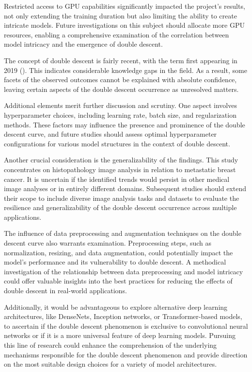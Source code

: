 Restricted access to GPU capabilities significantly impacted the project's results, not only extending the training duration but also limiting the ability to create intricate models. Future investigations on this subject should allocate more GPU resources, enabling a comprehensive examination of the correlation between model intricacy and the emergence of double descent.

The concept of double descent is fairly recent, with the term first appearing in 2019 (\cite{Belkin2019ReconcilingTrade-off}). This indicates considerable knowledge gaps in the field. As a result, some facets of the observed outcomes cannot be explained with absolute confidence, leaving certain aspects of the double descent occurrence as unresolved matters.

Additional elements merit further discussion and scrutiny. One aspect involves hyperparameter choices, including learning rate, batch size, and regularization methods. These factors may influence the presence and prominence of the double descent curve, and future studies should assess optimal hyperparameter configurations for various model structures in the context of double descent.

Another crucial consideration is the generalizability of the findings. This study concentrates on histopathology image analysis in relation to metastatic breast cancer. It is uncertain if the identified trends would persist in other medical image analyses or in entirely different domains. Subsequent studies should extend their scope to include diverse image analysis tasks and datasets to evaluate the resilience and generalizability of the double descent occurrence across multiple applications.

The influence of data preprocessing and augmentation techniques on the double descent curve also warrants examination. Preprocessing steps, such as normalization, resizing, and data augmentation, could potentially impact the model's performance and its vulnerability to double descent. A methodical investigation of the relationship between data preprocessing and model intricacy could offer valuable insights into the best practices for reducing the effects of double descent in real-world applications.

Additionally, it would be advantageous to explore alternative deep learning architectures, like DenseNets, Inception networks, or Transformer-based models, to ascertain if the double descent phenomenon is exclusive to convolutional neural networks or if it is a more universal feature of deep learning models. Pursuing this line of research could enhance the comprehension of the underlying mechanisms responsible for the double descent phenomenon and provide direction on the most suitable design choices for a variety of model architectures.